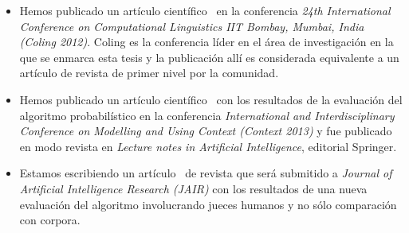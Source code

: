 \begin{itemize} \renewcommand{\itemsep}{-3pt}
\item Hemos publicado un art\'iculo cient\'ifico~\cite{arec:2012:coling12} en la conferencia \emph{24th International Conference on Computational Linguistics IIT Bombay, Mumbai, India (Coling 2012)}. Coling es la conferencia l\'ider en el \'area de investigaci\'on en la que se enmarca esta tesis y la publicaci\'on all\'i es considerada equivalente a un art\'iculo de revista de primer nivel por la comunidad. 
\item Hemos publicado un art\'iculo cient\'ifico~\cite{benotti-altamirano-context2013} con los resultados de la evaluaci\'on del algoritmo probabil\'istico en la conferencia \emph{International and Interdisciplinary Conference on Modelling and Using Context (Context 2013)} y fue publicado en modo revista en \emph{Lecture notes in Artificial Intelligence}, editorial Springer. 
\item Estamos escribiendo un art\'iculo~\cite{benotti-altamirano-jair} de revista que ser\'a submitido a \emph{Journal of Artificial Intelligence Research (JAIR)} con los resultados de una nueva evaluaci\'on del algoritmo involucrando jueces humanos y no s\'olo comparaci\'on con corpora.
\end{itemize}

